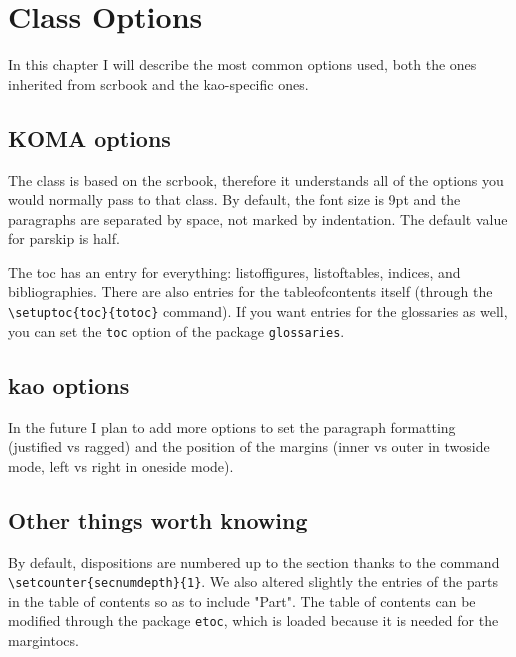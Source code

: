 \renewcommand*{\chapterformat}
{
  \enskip\mbox{\scalebox{3.5}{\framebox{\thechapter\autodot}}}
}
\renewcommand\chapterlinesformat[3]
{
  \parbox[b]{\textwidth+\marginparsep+\marginparwidth}{
	\parbox[b]{\textwidth}{#3}%
	\parbox[b]{\marginparsep}{\hfill}%
	\parbox[b]{\marginparwidth}{#2}%
  }
}
\setchapterpreamble[u]{\margintoc[*-3]}
\chapter{Class Options}

In this chapter I will describe the most common options used, both the 
ones inherited from scrbook and the kao-specific ones.

\section{KOMA options}

The class is based on the scrbook, therefore it understands all of the 
options you would normally pass to that class. By default, the font size 
is 9pt and the paragraphs are separated by space, not marked by 
indentation. The default value for parskip is half.

The toc has an entry for everything: listoffigures, listoftables, 
indices, and bibliographies. There are also entries for the 
tableofcontents itself (through the \verb|\setuptoc{toc}{totoc}| 
command). If you want entries for the glossaries as well, you can set 
the \verb|toc| option of the package \verb|glossaries|.

\section{kao options}

In the future I plan to add more options to set the paragraph formatting 
(justified vs ragged) and the position of the margins (inner vs outer in 
twoside mode, left vs right in oneside mode). 

\section{Other things worth knowing}

By default, dispositions are numbered up to the section thanks to the 
command \verb|\setcounter{secnumdepth}{1}|. We also altered slightly the 
entries of the parts in the table of contents so as to include "Part". 
The table of contents can be modified through the package \verb|etoc|, 
which is loaded because it is needed for the margintocs.

